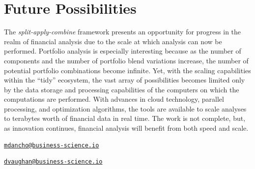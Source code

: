 \hspace{20 mm}

\section{Future Possibilities}\label{future-possibilities}

The \emph{split-apply-combine} framework presents an opportunity for
progress in the realm of financial analysis due to the scale at which
analysis can now be performed. Portfolio analysis is especially
interesting because as the number of components and the number of
portfolio blend variations increase, the number of potential portfolio
combinations become infinite. Yet, with the scaling capabilities within
the ``tidy'' ecosystem, the vast array of possibilities becomes limited
only by the data storage and processing capabilities of the computers on
which the computations are performed. With advances in cloud technology,
parallel processing, and optimization algorithms, the tools are
available to scale analyses to terabytes worth of financial data in real
time. The work is not complete, but, as innovation continues, financial
analysis will benefit from both speed and scale.

\pagebreak



\address{%
Matt Dancho\\
Business Science\\
\\
}
\href{mailto:mdancho@business-science.io}{\nolinkurl{mdancho@business-science.io}}

\address{%
Davis Vaughan\\
Business Science\\
\\
}
\href{mailto:dvaughan@business-science.io}{\nolinkurl{dvaughan@business-science.io}}


